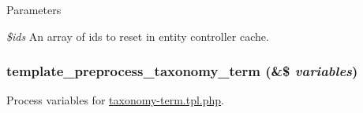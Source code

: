 \begin{DoxyParams}{Parameters}
\item[{\em \$ids}]An array of ids to reset in entity controller cache. \end{DoxyParams}
\hypertarget{taxonomy_8module_a7f112adf0c1b601f5a7e95fc58d583c8}{
\subsubsection[{template\_\-preprocess\_\-taxonomy\_\-term}]{\setlength{\rightskip}{0pt plus 5cm}template\_\-preprocess\_\-taxonomy\_\-term (\&\$ {\em variables})}}
\label{taxonomy_8module_a7f112adf0c1b601f5a7e95fc58d583c8}
Process variables for \hyperlink{taxonomy-term_8tpl_8php}{taxonomy-\/term.tpl.php}. 
